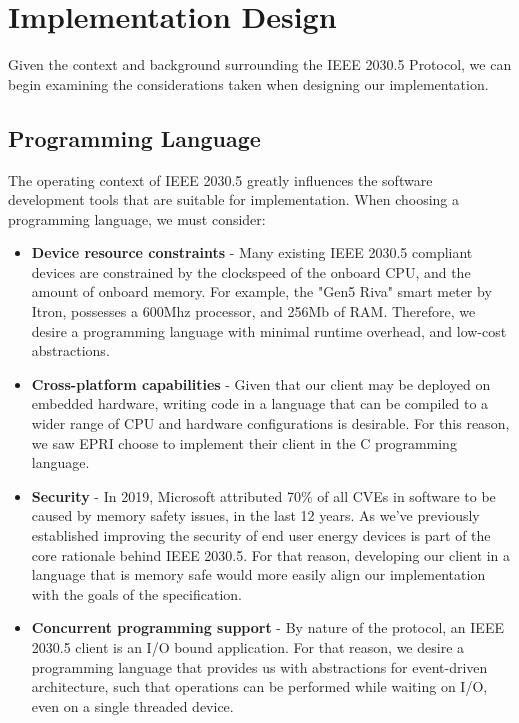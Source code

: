 \chapter{Implementation Design}\label{ch:implementation}
Given the context and background surrounding the IEEE 2030.5 Protocol, we can begin examining the considerations taken when designing our implementation.

\section{Programming Language}
The operating context of IEEE 2030.5 greatly influences the software development tools that are suitable for implementation.
When choosing a programming language, we must consider:

\begin{itemize}
    \item \textbf{Device resource constraints} - Many existing IEEE 2030.5 compliant devices are constrained by the clockspeed of the onboard CPU, and the amount of onboard memory.
    For example, the "Gen5 Riva" smart meter by Itron, possesses a 600Mhz processor, and 256Mb of RAM.\cite[]{Gen5Riva}
    \hfill \break
    Therefore, we desire a programming language with minimal runtime overhead, and low-cost abstractions.
    \item \textbf{Cross-platform capabilities} - Given that our client may be deployed on embedded hardware, writing code in a language that can be compiled to a wider range of CPU and hardware configurations is desirable. 
    For this reason, we saw EPRI choose to implement their client in the C programming language.
    \item \textbf{Security} - In 2019, Microsoft attributed 70\% of all CVEs in software to be caused by memory safety issues, in the last 12 years. \cite[]{SecurityMemorySafety}
    As we've previously established improving the security of end user energy devices is part of the core rationale behind IEEE 2030.5. For that reason, developing our client in a language that is memory safe would more easily align our implementation with the goals of the specification.
    \item \textbf{Concurrent programming support} - By nature of the protocol, an IEEE 2030.5 client is an I/O bound application. For that reason, we desire a programming language that provides us with abstractions for event-driven architecture, such that operations can be performed while waiting on I/O, even on a single threaded device.
\end{itemize}


